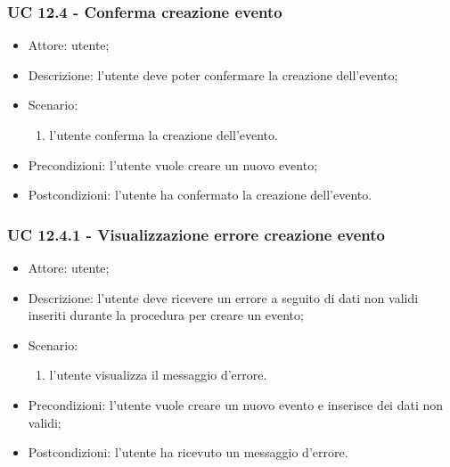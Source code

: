 \subsubsection{UC 12.4 - Conferma creazione evento} \label{sec: UC 12.4}
\begin{itemize}
    \item Attore: utente;
    \item Descrizione: l'utente deve poter confermare la creazione dell'evento;
    \item Scenario:
        \begin{enumerate}
        \item l'utente conferma la creazione dell'evento.
        \end{enumerate}
    
    \item Precondizioni: l'utente vuole creare un nuovo evento;
    \item Postcondizioni: l'utente ha confermato la creazione dell'evento.
\end{itemize}

\subsubsection{UC 12.4.1 - Visualizzazione errore creazione evento} \label{sec: UC 12.4.1}
\begin{itemize}
    \item Attore: utente;
    \item Descrizione: l'utente deve ricevere un errore a seguito di dati non validi inseriti durante la procedura per creare un evento;
    \item Scenario:
        \begin{enumerate}
        \item l'utente visualizza il messaggio d'errore.
        \end{enumerate}
    
    \item Precondizioni: l'utente vuole creare un nuovo evento e inserisce dei dati non validi;
    \item Postcondizioni: l'utente ha ricevuto un messaggio d'errore.
\end{itemize}



